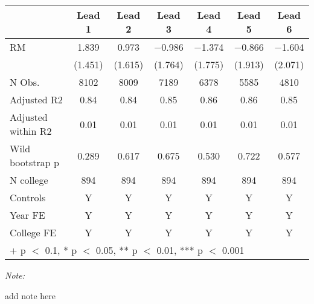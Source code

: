 \begin{table}
\centering
\begin{threeparttable}
\begin{tabular}[t]{lcccccc}
\toprule
  & Lead 1 & Lead 2 & Lead 3 & Lead 4 & Lead 5 & Lead 6\\
\midrule
RM & \num{1.839} & \num{0.973} & \num{-0.986} & \num{-1.374} & \num{-0.866} & \num{-1.604}\\
 & (\num{1.451}) & (\num{1.615}) & (\num{1.764}) & (\num{1.775}) & (\num{1.913}) & (\num{2.071})\\
\midrule
N Obs. & \num{8102} & \num{8009} & \num{7189} & \num{6378} & \num{5585} & \num{4810}\\
Adjusted R2 & \num{0.84} & \num{0.84} & \num{0.85} & \num{0.86} & \num{0.86} & \num{0.85}\\
Adjusted within R2 & \num{0.01} & \num{0.01} & \num{0.01} & \num{0.01} & \num{0.01} & \num{0.01}\\
Wild bootstrap p & 0.289 & 0.617 & 0.675 & 0.530 & 0.722 & 0.577\\
N college & 894 & 894 & 894 & 894 & 894 & 894\\
Controls & Y & Y & Y & Y & Y & Y\\
Year FE & Y & Y & Y & Y & Y & Y\\
College FE & Y & Y & Y & Y & Y & Y\\
\bottomrule
\multicolumn{7}{l}{\rule{0pt}{1em}+ p $<$ 0.1, * p $<$ 0.05, ** p $<$ 0.01, *** p $<$ 0.001}\\
\end{tabular}
\begin{tablenotes}
\item \textit{Note: } 
\item add note here
\end{tablenotes}
\end{threeparttable}
\end{table}
